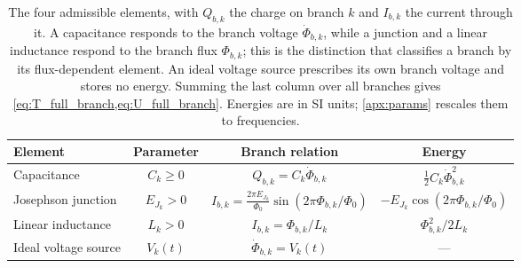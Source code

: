 \documentclass[10pt,aps,pra,onecolumn,superscriptaddress,floatfix,nofootinbib]{revtex4-2}
\begin{document}
\begin{table}[t]
    \centering
    \setlength{\tabcolsep}{10pt}
    \begin{tabular}{l c c c}
        \toprule
        Element & Parameter & Branch relation & Energy \\
        \midrule
        Capacitance & $C_k \geq 0$ & $Q_{b,k} = C_k\dot\Phi_{b,k}$ & $\frac{1}{2}C_k\dot\Phi_{b,k}^2$ \\[4pt]
        Josephson junction & $E_{J_k} > 0$ & $I_{b,k} = \frac{2\pi E_{J_k}}{\Phi_0}\sin(2\pi\Phi_{b,k}/\Phi_0)$ & $-E_{J_k}\cos(2\pi\Phi_{b,k}/\Phi_0)$ \\[4pt]
        Linear inductance & $L_k > 0$ & $I_{b,k} = \Phi_{b,k}/L_k$ & $\Phi_{b,k}^2/2L_k$ \\[4pt]
        Ideal voltage source & $V_k(t)$ & $\dot\Phi_{b,k} = V_k(t)$ & --- \\
        \bottomrule
    \end{tabular}
    \caption{The four admissible elements, with $Q_{b,k}$ the charge on branch $k$ and $I_{b,k}$ the current through it.
    A capacitance responds to the branch voltage $\dot\Phi_{b,k}$, while a junction and a linear inductance respond to the branch flux $\Phi_{b,k}$; this is the distinction that classifies a branch by its flux-dependent element.
    An ideal voltage source prescribes its own branch voltage and stores no energy.
    Summing the last column over all branches gives \cref{eq:T_full_branch,eq:U_full_branch}.
    Energies are in SI units; \cref{apx:params} rescales them to frequencies.}
    \label{tab:elements}
\end{table}
\end{document}
